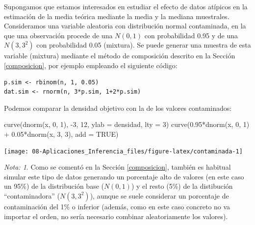 \documentclass[
]{book}
\newenvironment{Shaded}{\begin{snugshade}}{\end{snugshade}}
\newcommand{\AttributeTok}[1]{\textcolor[rgb]{0.77,0.63,0.00}{#1}}
\newcommand{\ConstantTok}[1]{\textcolor[rgb]{0.00,0.00,0.00}{#1}}
\newcommand{\DecValTok}[1]{\textcolor[rgb]{0.00,0.00,0.81}{#1}}
\newcommand{\FloatTok}[1]{\textcolor[rgb]{0.00,0.00,0.81}{#1}}
\newcommand{\FunctionTok}[1]{\textcolor[rgb]{0.00,0.00,0.00}{#1}}
\newcommand{\NormalTok}[1]{#1}
\newcommand{\SpecialCharTok}[1]{\textcolor[rgb]{0.00,0.00,0.00}{#1}}
\newcommand{\StringTok}[1]{\textcolor[rgb]{0.31,0.60,0.02}{#1}}
\theoremstyle{break}
\theoremstyle{definition}
\theoremstyle{definition}
\theoremstyle{definition}
\theoremstyle{definition}
\theoremstyle{remark}
\newtheorem*{remark}{Nota: }
\begin{document}
Supongamos que estamos interesados en estudiar el efecto de datos atípicos en la estimación de la media teórica mediante la media y la mediana muestrales.
Consideramos una variable aleatoria con distribución normal contaminada, en la que una observación procede de una \(N(0,1)\) con probabilidad 0.95 y de una \(N(3,3^2)\) con probabilidad 0.05 (mixtura).
Se puede generar una muestra de esta variable (mixtura) mediante el método de composición descrito en la Sección \ref{composicion}, por ejemplo empleando el siguiente código:

\begin{verbatim}
p.sim <- rbinom(n, 1, 0.05)
dat.sim <- rnorm(n, 3*p.sim, 1+2*p.sim)
\end{verbatim}

Podemos comparar la densidad objetivo con la de los valores contaminados:

\begin{Shaded}
\begin{Highlighting}[]
\FunctionTok{curve}\NormalTok{(}\FunctionTok{dnorm}\NormalTok{(x, }\DecValTok{0}\NormalTok{, }\DecValTok{1}\NormalTok{), }\SpecialCharTok{{-}}\DecValTok{3}\NormalTok{, }\DecValTok{12}\NormalTok{, }\AttributeTok{ylab =} \StringTok{\textquotesingle{}densidad\textquotesingle{}}\NormalTok{, }\AttributeTok{lty =} \DecValTok{3}\NormalTok{)}
\FunctionTok{curve}\NormalTok{(}\FloatTok{0.95}\SpecialCharTok{*}\FunctionTok{dnorm}\NormalTok{(x, }\DecValTok{0}\NormalTok{, }\DecValTok{1}\NormalTok{) }\SpecialCharTok{+} \FloatTok{0.05}\SpecialCharTok{*}\FunctionTok{dnorm}\NormalTok{(x, }\DecValTok{3}\NormalTok{, }\DecValTok{3}\NormalTok{), }\AttributeTok{add =} \ConstantTok{TRUE}\NormalTok{)}
\end{Highlighting}
\end{Shaded}

\begin{center}\texttt{[image: 08-Aplicaciones\_Inferencia\_files/figure-latex/contaminada-1]} \end{center}

\begin{remark}
{}Como se comentó en la Sección \ref{composicion}, también es habitual simular este tipo de datos generando un porcentaje alto de valores (en este caso un 95\%) de la distribución base (\(N(0,1)\)) y el resto (5\%) de la distibución ``contaminadora'' (\(N(3,3^2)\)), aunque se suele considerar un porcentaje de contaminación del 1\% o inferior (además, como en este caso concreto no va importar el orden, no sería necesario combinar aleatoriamente los valores).
\end{remark}
\end{document}
